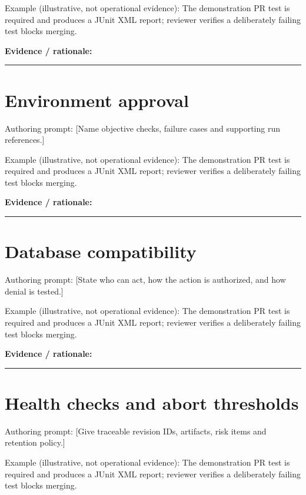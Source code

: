 \documentclass[11pt,letterpaper]{article}
\begin{document}
Example (illustrative, not operational evidence): The demonstration PR test is required and produces a JUnit XML report; reviewer verifies a deliberately failing test blocks merging.

\noindent\textbf{Evidence / rationale:}\par\nobreak\vspace{8pt}\noindent\rule{0.93\linewidth}{0.4pt}\par\vspace{14pt}
\section{Environment approval}
Authoring prompt: [Name objective checks, failure cases and supporting run references.]

Example (illustrative, not operational evidence): The demonstration PR test is required and produces a JUnit XML report; reviewer verifies a deliberately failing test blocks merging.

\noindent\textbf{Evidence / rationale:}\par\nobreak\vspace{8pt}\noindent\rule{0.93\linewidth}{0.4pt}\par\vspace{14pt}
\section{Database compatibility}
Authoring prompt: [State who can act, how the action is authorized, and how denial is tested.]

Example (illustrative, not operational evidence): The demonstration PR test is required and produces a JUnit XML report; reviewer verifies a deliberately failing test blocks merging.

\noindent\textbf{Evidence / rationale:}\par\nobreak\vspace{8pt}\noindent\rule{0.93\linewidth}{0.4pt}\par\vspace{14pt}
\section{Health checks and abort thresholds}
Authoring prompt: [Give traceable revision IDs, artifacts, risk items and retention policy.]

Example (illustrative, not operational evidence): The demonstration PR test is required and produces a JUnit XML report; reviewer verifies a deliberately failing test blocks merging.
\end{document}
